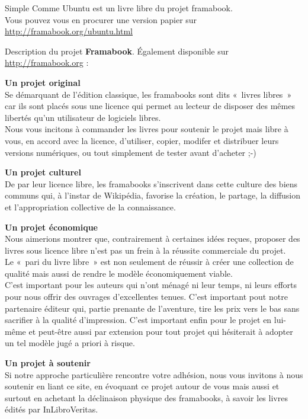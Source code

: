 \null{}
{\centering\fontsize{14}{16}\selectfont{}Simple Comme Ubuntu est un livre libre du projet framabook.\\
Vous pouvez vous en procurer une version papier sur\\\url{http://framabook.org/ubuntu.html}}\par
{\fontsize{12}{14}\selectfont{}Description du projet \textbf{Framabook}. Également disponible sur \url{http://framabook.org} :\par
\textbf{Un projet original}\\
Se démarquant de l'édition classique, les framabooks sont dits «~livres libres~» car ils sont placés sous une licence qui permet au lecteur de disposer des mêmes libertés qu'un utilisateur de logiciels libres.\\
Nous vous incitons à commander les livres pour soutenir le projet mais libre à vous, en accord avec la licence, d'utiliser, copier, modifer et distribuer leurs versions numériques, ou tout simplement de tester avant d'acheter ;-)\par
\textbf{Un projet culturel}\\
De par leur licence libre, les framabooks s'inscrivent dans cette culture des biens communs qui, à l'instar de Wikipédia, favorise la création, le partage, la diffusion et l'appropriation collective de la connaissance.\par
\textbf{Un projet économique}\\
Nous aimerions montrer que, contrairement à certaines idées reçues, proposer des livres sous licence libre n'est pas un frein à la réussite commerciale du projet.\\
Le «~pari du livre libre~» est non seulement de réussir à créer une collection de qualité mais aussi de rendre le modèle économiquement viable.\\
C'est important pour les auteurs qui n'ont ménagé ni leur temps, ni leurs efforts pour nous offrir des ouvrages d'excellentes tenues. C'est important pout notre partenaire éditeur qui, partie prenante de l'aventure, tire les prix vers le bas sans sacrifier à la qualité d'impression. C'est important enfin pour le projet en lui-même et peut-être aussi par extension pour tout projet qui hésiterait à adopter un tel modèle jugé a priori à risque.\par
\textbf{Un projet à soutenir}\\
Si notre approche particulière rencontre votre adhésion, nous vous invitons à nous soutenir en liant ce site, en évoquant ce projet autour de vous mais aussi et surtout en achetant la déclinaison physique des framabooks, à savoir les livres édités par InLibroVeritas.\\
}
